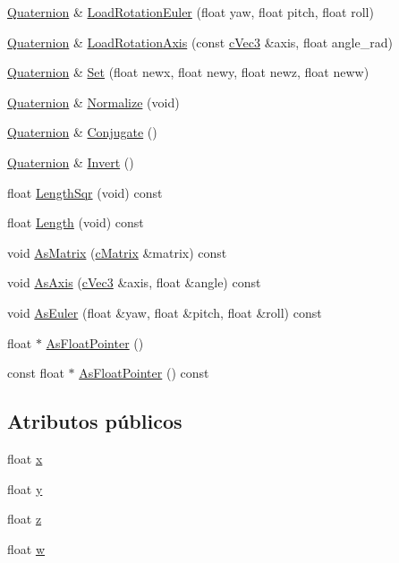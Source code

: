 \begin{DoxyCompactItemize}
\item 
\hyperlink{struct_quaternion}{Quaternion} \& \hyperlink{struct_quaternion_a3c99a53b568de7f5615c96bd906ff4dc}{LoadRotationEuler} (float yaw, float pitch, float roll)
\item 
\hyperlink{struct_quaternion}{Quaternion} \& \hyperlink{struct_quaternion_a0ff63fa162a83bfffb51204778907b65}{LoadRotationAxis} (const \hyperlink{structc_vec3}{cVec3} \&axis, float angle\_\-rad)
\item 
\hyperlink{struct_quaternion}{Quaternion} \& \hyperlink{struct_quaternion_a35bfd6227bb768e4cb6439b330cd6a4b}{Set} (float newx, float newy, float newz, float neww)
\item 
\hyperlink{struct_quaternion}{Quaternion} \& \hyperlink{struct_quaternion_a1abadacdc1ee6a236cde78c9bd1229b1}{Normalize} (void)
\item 
\hyperlink{struct_quaternion}{Quaternion} \& \hyperlink{struct_quaternion_a92dc45f84709ac09e4be54f671f75244}{Conjugate} ()
\item 
\hyperlink{struct_quaternion}{Quaternion} \& \hyperlink{struct_quaternion_adf3f5e1c40394774ae7e4662bdd8c477}{Invert} ()
\item 
float \hyperlink{struct_quaternion_acba07039fb1d33470dbd37f2006280ed}{LengthSqr} (void) const 
\item 
float \hyperlink{struct_quaternion_ade39732093b98854241519d19916310b}{Length} (void) const 
\item 
void \hyperlink{struct_quaternion_ab0ec79d0fc86a863a4721af8bca5226d}{AsMatrix} (\hyperlink{structc_matrix}{cMatrix} \&matrix) const 
\item 
void \hyperlink{struct_quaternion_aeeecfc1222faf1ca6d09a71c38b3de43}{AsAxis} (\hyperlink{structc_vec3}{cVec3} \&axis, float \&angle) const 
\item 
void \hyperlink{struct_quaternion_ac1fad9f2d56b2364a082ca750a26f6b5}{AsEuler} (float \&yaw, float \&pitch, float \&roll) const 
\item 
float $\ast$ \hyperlink{struct_quaternion_a6eb6dec27fa8bb0a7ece63519e365647}{AsFloatPointer} ()
\item 
const float $\ast$ \hyperlink{struct_quaternion_ab0f9d23602fdd6b8a824f7a22db02d13}{AsFloatPointer} () const 
\end{DoxyCompactItemize}
\subsection*{Atributos públicos}
\begin{DoxyCompactItemize}
\item 
float \hyperlink{struct_quaternion_a8b80f191a3155cc0158d2b4f4d50b2cb}{x}
\item 
float \hyperlink{struct_quaternion_a3bd3f270462944423611f44e19d2511b}{y}
\item 
float \hyperlink{struct_quaternion_a625cb732d8ff3083e7852b86b736ab29}{z}
\item 
float \hyperlink{struct_quaternion_aa44a65ab99e36f6ab8771030eed8a7ad}{w}
\end{DoxyCompactItemize}


